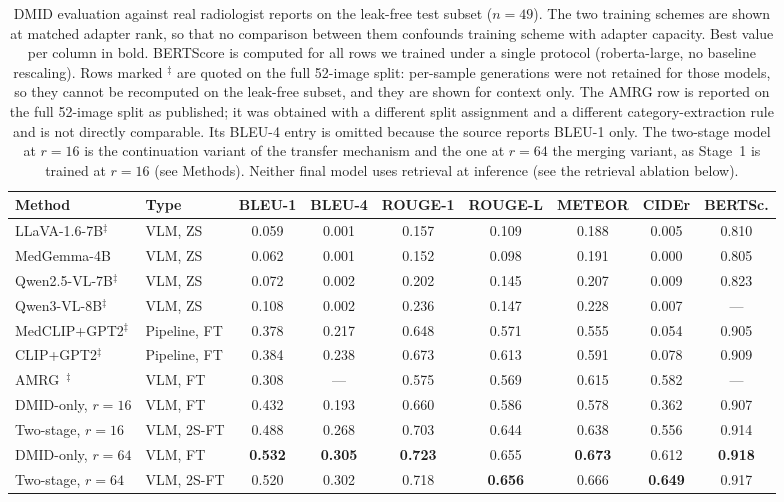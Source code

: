 \documentclass{wlscirep}
\begin{document}
\begin{table}[H]
\centering
\caption{DMID evaluation against real radiologist reports on the leak-free test subset ($n=49$). The two training schemes are shown at matched adapter rank, so that no comparison between them confounds training scheme with adapter capacity. Best value per column in bold. BERTScore is computed for all rows we trained under a single protocol (roberta-large, no baseline rescaling). Rows marked $^{\ddagger}$ are quoted on the full 52-image split: per-sample generations were not retained for those models, so they cannot be recomputed on the leak-free subset, and they are shown for context only. The AMRG row is reported on the full 52-image split as published; it was obtained with a different split assignment and a different category-extraction rule and is not directly comparable. Its BLEU-4 entry is omitted because the source reports BLEU-1 only. The two-stage model at $r=16$ is the continuation variant of the transfer mechanism and the one at $r=64$ the merging variant, as Stage~1 is trained at $r=16$ (see Methods). Neither final model uses retrieval at inference (see the retrieval ablation below).}
\label{tab:dmid}
\begin{adjustbox}{max width=\textwidth}
\begin{tabular}{llccccccc}
\toprule
\textbf{Method} & \textbf{Type} & \textbf{BLEU-1} & \textbf{BLEU-4} & \textbf{ROUGE-1} & \textbf{ROUGE-L} & \textbf{METEOR} & \textbf{CIDEr} & \textbf{BERTSc.} \\
\midrule
LLaVA-1.6-7B$^{\ddagger}$ & VLM, ZS & 0.059 & 0.001 & 0.157 & 0.109 & 0.188 & 0.005 & 0.810 \\
MedGemma-4B & VLM, ZS & 0.062 & 0.001 & 0.152 & 0.098 & 0.191 & 0.000 & 0.805 \\
Qwen2.5-VL-7B$^{\ddagger}$ & VLM, ZS & 0.072 & 0.002 & 0.202 & 0.145 & 0.207 & 0.009 & 0.823 \\
Qwen3-VL-8B$^{\ddagger}$ & VLM, ZS & 0.108 & 0.002 & 0.236 & 0.147 & 0.228 & 0.007 & --- \\
MedCLIP+GPT2$^{\ddagger}$ & Pipeline, FT & 0.378 & 0.217 & 0.648 & 0.571 & 0.555 & 0.054 & 0.905 \\
CLIP+GPT2$^{\ddagger}$ & Pipeline, FT & 0.384 & 0.238 & 0.673 & 0.613 & 0.591 & 0.078 & 0.909 \\
AMRG~\cite{sung2025}$^{\ddagger}$ & VLM, FT & 0.308 & --- & 0.575 & 0.569 & 0.615 & 0.582 & --- \\
\midrule
DMID-only, $r{=}16$ & VLM, FT & 0.432 & 0.193 & 0.660 & 0.586 & 0.578 & 0.362 & 0.907 \\
Two-stage, $r{=}16$ & VLM, 2S-FT & 0.488 & 0.268 & 0.703 & 0.644 & 0.638 & 0.556 & 0.914 \\
DMID-only, $r{=}64$ & VLM, FT & \textbf{0.532} & \textbf{0.305} & \textbf{0.723} & 0.655 & \textbf{0.673} & 0.612 & \textbf{0.918} \\
Two-stage, $r{=}64$ & VLM, 2S-FT & 0.520 & 0.302 & 0.718 & \textbf{0.656} & 0.666 & \textbf{0.649} & 0.917 \\
\bottomrule
\end{tabular}
\end{adjustbox}
\end{table}
\end{document}
